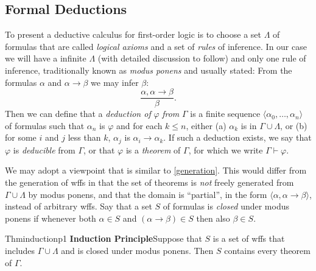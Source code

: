 \subsection*{Formal Deductions}

To present a deductive calculus for first-order logic is to choose a set $\Lambda$ of formulas that are called \textit{logical axioms} and a set of \textit{rules} of inference. In our case we will have a infinite $\Lambda$ (with detailed discussion to follow) and only one rule of inference, traditionally known as \textit{modus ponens} and usually stated: From the formulas $\alpha$ and $\alpha\rightarrow \beta$ we may infer $\beta$:
\[
  \frac{\alpha,\alpha\rightarrow \beta}{\beta}.
\]
Then we can define that a \textit{deduction of} $\varphi$ \textit{from} $\Gamma$ is a finite sequence $\langle \alpha_0,\dots,\alpha_n\rangle$ of formulas such that $\alpha_n$ is $\varphi$ and for each $k\leq n$, either (a) $\alpha_k$ is in $\Gamma\cup \Lambda$, or (b) for some $i$ and $j$ less than $k$, $\alpha_j$ is $\alpha_i\rightarrow \alpha_k$. If such a deduction exists, we say that $\varphi$ is \textit{deducible} from $\Gamma$, or that $\varphi$ is a \textit{theorem} of $\Gamma$, for which we write $\Gamma\vdash \varphi$.

We may adopt a viewpoint that is similar to \ref{generation}. This would differ from the generation of wffs in that the set of theorems is \textit{not} freely generated from $\Gamma\cup \Lambda$ by modus ponens, and that the domain is ``partial'', in the form $\langle \alpha,\alpha\rightarrow \beta\rangle$, instead of arbitrary wffs. Say that a set $S$ of formulas is \textit{closed} under modus ponens if whenever both $\alpha\in S$ and $(\alpha\rightarrow \beta)\in S$ then also $\beta\in S.$

\begin{reference}{Thm}{inductionp1}
  \textbf{Induction Principle}\quad Suppose that $S$ is a set of wffs that includes $\Gamma\cup \Lambda$ and is closed under modus ponens. Then $S$ contains every theorem of $\Gamma$.
\end{reference}

